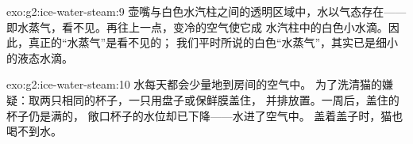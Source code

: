 \begin{solution}{exo:g2:ice-water-steam:9}
壶嘴与白色水汽柱之间的透明区域中，水以气态存在——
即水蒸气，看不见。再往上一点，变冷的空气使它成
水汽柱中的白色小水滴。因此，真正的“水蒸气”是看不见的；
我们平时所说的白色“水蒸气”，其实已是细小的液态水滴。
\end{solution}

\begin{solution}{exo:g2:ice-water-steam:10}
水每天都会少量地到房间的空气中。
为了洗清猫的嫌疑：取两只相同的杯子，一只用盘子或保鲜膜盖住，
并排放置。一周后，盖住的杯子仍是满的，
敞口杯子的水位却已下降——水进了空气中。
盖着盖子时，猫也喝不到水。
\end{solution}
